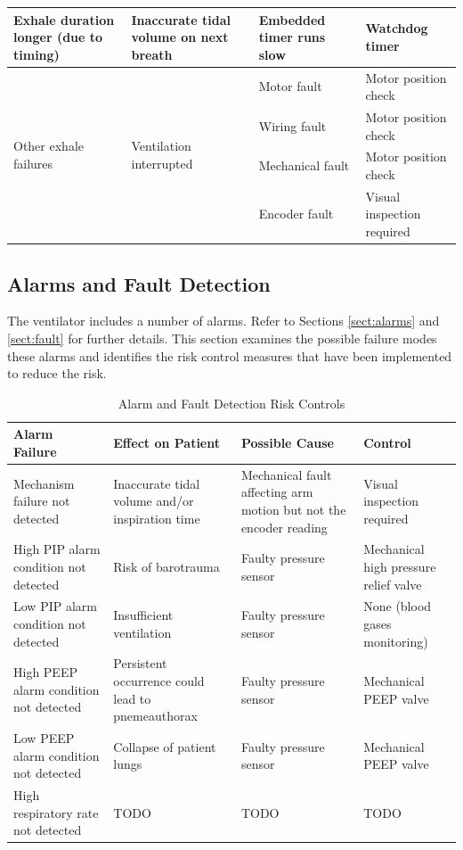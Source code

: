 \documentclass[]{article}
\begin{document}
\begin{center}
\begin{table}[h]
\begin{tabular}{ |p{3.5cm}|p{3cm}| p{3.5cm}| p{3.5cm}|}
			Exhale duration longer (due to timing) & Inaccurate tidal volume on next breath &Embedded timer runs slow & Watchdog timer \\ \hline
			\multirow{4}{3.5cm}{Other exhale failures} & \multirow{4}{3cm}{Ventilation interrupted} & Motor fault & Motor position check\\ \cline{3-4}
			& & Wiring fault & Motor position check\\ \cline{3-4}
			& & Mechanical fault & Motor position check\\ \cline{3-4}
			& & Encoder fault & Visual inspection required\\ \hline
			
		\end{tabular}
	\end{table}	
\end{center}

\subsection{Alarms and Fault Detection}
The ventilator includes a number of alarms. Refer to Sections \ref{sect:alarms} and \ref{sect:fault} for further details. This section examines the possible failure modes these alarms and identifies the risk control measures that have been implemented to reduce the risk.

\begin{center}
	\begin{table}[h]
		\caption{Alarm and Fault Detection Risk Controls}
		\label{tab:alarm_risk}
		\begin{tabular}{ |p{3.5cm}|p{3cm}| p{3.5cm}| p{3.5cm}|}
			
			
			\hline
			\textbf{Alarm Failure}& \textbf{Effect on Patient} &\textbf{Possible Cause} & \textbf{Control}  \\ \hline
			Mechanism failure not detected & Inaccurate tidal volume and/or inspiration time& Mechanical fault affecting arm motion but not the encoder reading & Visual inspection required\\ \hline
			High PIP alarm condition not detected & Risk of barotrauma & Faulty pressure sensor & Mechanical high pressure relief valve\\ \hline
			Low PIP alarm condition not detected & Insufficient ventilation & Faulty pressure sensor & None (blood gases monitoring)\\ \hline
			High PEEP alarm condition not detected& Persistent occurrence could lead to pnemeauthorax & Faulty pressure sensor & Mechanical PEEP valve\\ \hline
			Low PEEP alarm condition not detected & Collapse of patient lungs & Faulty pressure sensor & Mechanical PEEP valve\\ \hline
			High respiratory rate not detected & TODO & TODO & TODO\\ \hline
		
			
		\end{tabular}
	\end{table}	
\end{center}
\end{document}
